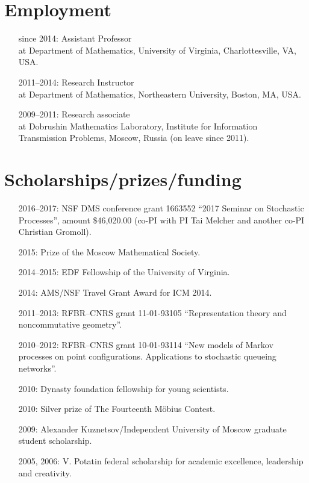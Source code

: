\documentclass[letterpaper,11pt]{article}
\begin{document}
\section*{Employment}

\begin{itemize}
\item[since 2014:]
Assistant Professor\\
at Department of Mathematics, 
University of Virginia, 
Charlottesville, VA, USA.

\item[2011--2014:]
Research Instructor\\ at
Department of Mathematics,
Northeastern University, Boston, MA, USA.

\item[2009--2011:]
Research associate\\
at
Dobrushin Mathematics Laboratory,
Institute for Information Transmission Problems, Moscow, Russia (on leave since 2011).
\end{itemize}

\section*{Scholarships/prizes/funding}
\begin{itemize}
	\item[2016--2017:]
	NSF DMS conference grant 1663552 ``2017 Seminar on Stochastic Processes'', amount \$46,020.00
	(co-PI with PI Tai Melcher and another co-PI Christian Gromoll).
	\item[2015:] Prize of the Moscow Mathematical Society.
	\item[2014--2015:] EDF Fellowship of the University of Virginia. 
	\item[2014:] AMS/NSF Travel Grant Award for ICM 2014.
	\item[2011--2013:] RFBR--CNRS grant 11-01-93105 ``Representation theory and noncommutative geometry''.
	\item[2010--2012:] RFBR--CNRS grant 10-01-93114 ``New models of Markov processes on point configurations. Applications to stochastic queueing networks''.
	\item[2010:] Dynasty foundation fellowship for young scientists.
	\item[2010:] Silver prize of The Fourteenth M\"obius Contest.
	\item[2009:] Alexander Kuznetsov/Independent University of Moscow graduate student scholarship.
	\item[2005, 2006:] V. Potatin federal scholarship for academic excellence, leadership and creativity.
\end{itemize}
\end{document}
